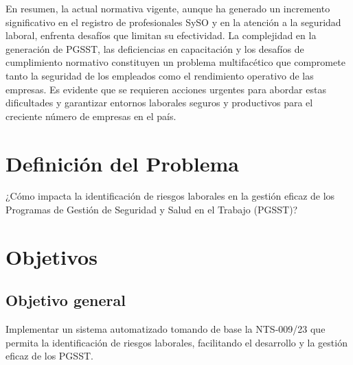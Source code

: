 En resumen, la actual normativa vigente, aunque ha generado un incremento significativo en el registro de profesionales SySO y en la atención a la seguridad laboral, enfrenta desafíos que limitan su efectividad. La complejidad en la generación de PGSST, las deficiencias en capacitación y los desafíos de cumplimiento normativo constituyen un problema multifacético que compromete tanto la seguridad de los empleados como el rendimiento operativo de las empresas. Es evidente que se requieren acciones urgentes para abordar estas dificultades y garantizar entornos laborales seguros y productivos para el creciente número de empresas en el país.

\section{Definición del Problema} 
¿Cómo impacta la identificación de riesgos laborales en la gestión eficaz de los Programas de Gestión de Seguridad y Salud en el Trabajo (PGSST)?

\section{Objetivos}
\subsection{Objetivo general}
Implementar un sistema automatizado tomando de base la NTS-009/23 que permita la identificación de riesgos laborales, facilitando el desarrollo y la gestión eficaz de los PGSST.

